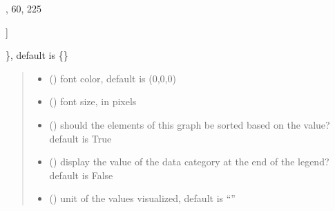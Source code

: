 \documentclass[letterpaper,10pt,english]{sphinxmanual}
\begin{document}
\begin{fulllineitems}
\begin{quote}
\begin{description}
\end{description}\end{quote}
\begin{description}
\begin{description}
\sphinxlineitem{\{}\begin{description}
\sphinxlineitem{“United States”: {[}}
,
60,
225

\end{description}

\sphinxAtStartPar
{]}

\end{description}

\sphinxAtStartPar
\}, default is \{\}

\end{description}
\begin{quote}\begin{description}
\begin{itemize}
\item {} 
\sphinxAtStartPar
{} () \textendash{} font color, default is (0,0,0)

\item {} 
\sphinxAtStartPar
{} () \textendash{} font size, in pixels

\item {} 
\sphinxAtStartPar
{} () \textendash{} should the elements of this graph be sorted based on the value? default is True

\item {} 
\sphinxAtStartPar
{} () \textendash{} display the value of the data category at the end of the legend? default is False

\item {} 
\sphinxAtStartPar
{} () \textendash{} unit of the values visualized, default is “”


\end{itemize}
\end{description}
\end{quote}
\end{fulllineitems}
\end{document}
